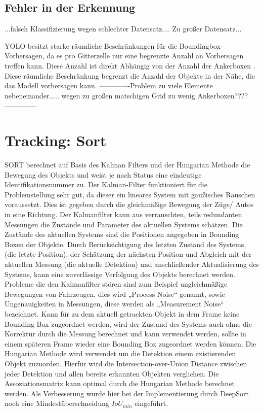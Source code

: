 \documentclass[conference]{IEEEtran}
\begin{document}
	\subsection{Fehler in der Erkennung}
	...falsch Klassifizierung wegen schlechter Datensatz....
	Zu großer Datensatz...
	
	YOLO besitzt starke räumliche Beschränkungen für die Boundingbox-Vorhersagen, da es pro Gitterzelle nur eine begrenzte Anzahl an Vorhersagen treffen kann. Diese Anzahl ist direkt Abhängig von der Anzahl der Ankerboxen \cite{b3}. Diese räumliche Beschränkung begrenzt die Anzahl der Objekte in der Nähe, die das Modell vorhersagen kann. 
	-------------Problem zu viele Elemente nebeneinander..... wegen zu großen matschigen Grid zu wenig Ankerboxen????--------------

	\section{Tracking: Sort}
	SORT berechnet auf Basis des Kalman Filters und der Hungarian Methode die Bewegung des Objekts und weist je nach Status eine eindeutige Identifikationsnummer zu. Der Kalman-Filter funktioniert für die Problemstellung sehr gut, da dieser ein lineares System mit gaußisches Rauschen voraussetzt. Dies ist gegeben durch die gleichmäßige Bewegung der Züge/ Autos in eine Richtung.
	Der Kalmanfilter kann aus verrauschten, teils redundanten Messungen die Zustände und Parameter des aktuellen Systems schätzen. Die Zustände des aktuellen Systems sind die Positionen angegeben in Bounding Boxen der Objekte. Durch Berücksichtigung des letzten Zustand des Systems, (die letzte Position), der Schätzung der nächsten Position und Abgleich mit der aktuellen Messung (die aktuelle Detektion) und anschließender Aktualisierung des Systems, kann eine zuverlässige Verfolgung des Objekts berechnet werden. Probleme die den Kalmanfilter stören sind zum Beispiel ungleichmäßige Bewegungen von Fahrzeugen, dies wird „Process Noise“ genannt, sowie Ungenauigkeiten in Messungen, diese werden als „Measurement Noise“ bezeichnet.
	Kann für zu dem aktuell getrackten Objekt in dem Frame keine Bounding Box zugeordnet werden, wird der Zustand des Systems auch ohne die Korrektur durch die Messung berechnet und kann verwendet werden, sollte in einem späteren Frame wieder eine Bounding Box zugeordnet werden können. 
	Die Hungarian Methode wird verwendet um die Detektion einem existierenden Objekt zuzuorden. Hierfür wird die Intersection-over-Union Distance zwischen jeder Detektion und allen bereits erkannten Objekten verglichen. Die Assoziationsmatrix kann optimal durch die Hungarian Methode berechnet werden. Als Verbesserung wurde hier bei der Implementierung durch DeepSort noch eine Mindestüberschneidung $IoU_{min}$ eingeführt.
	
\end{document}
